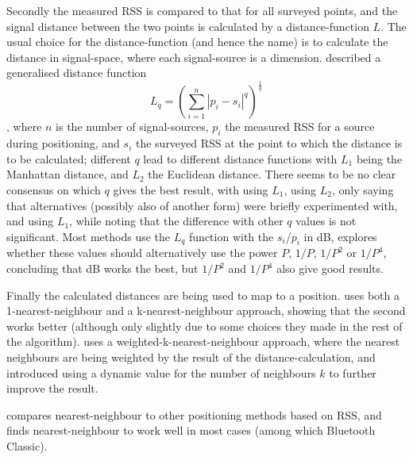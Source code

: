 Secondly the measured RSS is compared to that for all surveyed points, and the signal distance between the two points is calculated by a distance-function $L$.
The usual choice for the distance-function (and hence the name) is to calculate the distance in signal-space, where each signal-source is a dimension.
\citet{li2005method} described a generalised distance function
\begin{equation}
    L_q = \left(\sum_{i=1}^{n}|p_i-s_i|^q\right)^{\frac{1}{q}}
    \label{eq:architecture-distance}
\end{equation}
, where $n$ is the number of signal-sources, $p_i$ the measured RSS for a source during positioning, and $s_i$ the surveyed RSS at the point to which the distance is to be calculated; different $q$ lead to different distance functions with $L_1$ being the Manhattan distance, and $L_2$ the Euclidean distance.
There seems to be no clear consensus on which $q$ gives the best result, with \citet{shin2012enhanced} using $L_1$, \citet{bahl2000radar} using $L_2$, only saying that alternatives (possibly also of another form) were briefly experimented with, and \citet{li2005method} using $L_1$, while noting that the difference with other $q$ values is not significant.
Most methods use the $L_q$ function with the $s_i$/$p_i$ in dB, \citet{li2005method} explores whether these values should alternatively use the power $P$, $1/P$, $1/P^2$ or $1/P^4$, concluding that dB works the best, but $1/P^2$ and $1/P^4$ also give good results.

Finally the calculated distances are being used to map to a position.
\citet{bahl2000radar} uses both a 1-nearest-neighbour and a k-nearest-neighbour approach, showing that the second works better (although only slightly due to some choices they made in the rest of the algorithm).
\citet{li2005method} uses a weighted-k-nearest-neighbour approach, where the nearest neighbours are being weighted by the result of the distance-calculation, and \citet{shin2012enhanced} introduced using a dynamic value for the number of neighbours $k$ to further improve the result.

\citet{pandya2003indoor} compares nearest-neighbour to other positioning methods based on RSS, and finds nearest-neighbour to work well in most cases (among which Bluetooth Classic).

